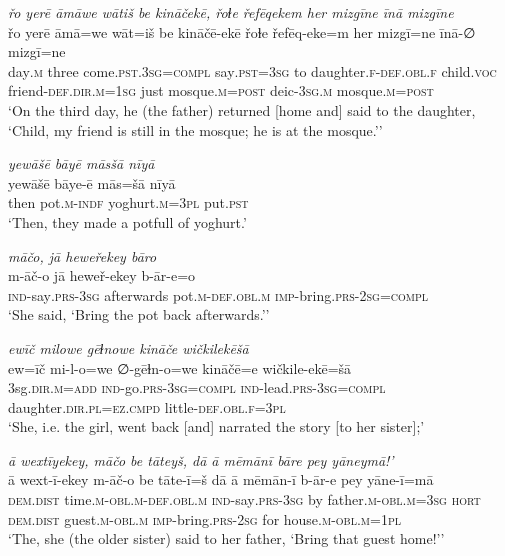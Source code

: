 \ea \label{ŽH.37}
\textit{řo yerē āmāwe wātiš be kināčekē, řoɫe řefēqekem her mizgīne īnā mizgīne} \\ 
\gll řo yerē āmā=we wāt=iš be kināčē-ekē řoɫe řefēq-eke=m her mizgī=ne īnā-∅ mizgī=ne \\ 
 day\textsc{.m} three come\textsc{.pst}\textsc{.3sg}\textsc{=compl} say\textsc{.pst}\textsc{=3sg} to daughter\textsc{\textsc{.f}}\textsc{-def}\textsc{.obl}\textsc{\textsc{.f}} child.\textsc{voc} friend\textsc{-def}\textsc{.dir}\textsc{.m}\textsc{=1sg} just mosque\textsc{.m}\textsc{=\textsc{post}} deic\textsc{-3sg}\textsc{.m} mosque\textsc{.m}\textsc{=\textsc{post}} \\ 
\glt `On the third day, he (the father) returned [home and] said to the daughter, ‘Child, my friend is still in the mosque; he is at the mosque.’'
\z 
 
\ea \label{ŽH.39}
\textit{yewāšē bāyē māsšā nīyā} \\ 
\gll yewāšē bāye-ē mās=šā nīyā \\ 
 then pot\textsc{.m}\textsc{-indf} yoghurt\textsc{.m}\textsc{=3pl} put\textsc{.pst} \\ 
\glt `Then, they made a potfull of yoghurt.'
\z 
 
\ea \label{ŽH.44}
\textit{māčo, jā heweřekey bāro} \\ 
\gll m-āč-o jā heweř-ekey b-ār-e=o \\ 
 \textsc{ind-}say\textsc{.prs}\textsc{-3sg} afterwards pot\textsc{.m}\textsc{-def}\textsc{.obl}\textsc{.m} \textsc{imp-}bring\textsc{.prs}-\textsc{2sg}\textsc{=compl} \\ 
\glt `She said, ‘Bring the pot back afterwards.’'
\z 
 
\ea \label{ŽH.46}
\textit{ewīč milowe gēɫnowe kināče wičkilekēšā} \\ 
\gll ew=īč mi-l-o=we ∅-gēɫn-o=we kināčē=e wičkile-ekē=šā \\ 
 3sg\textsc{.dir}\textsc{.m}\textsc{=add} \textsc{ind-}go\textsc{.prs}\textsc{-3sg}\textsc{=compl} \textsc{ind-}lead\textsc{.prs}\textsc{-3sg}\textsc{=compl} daughter\textsc{.dir}\textsc{.pl}\textsc{=ez}\textsc{.cmpd} little\textsc{-def}\textsc{.obl}\textsc{\textsc{.f}}\textsc{=3pl} \\ 
\glt `She, i.e. the girl, went back [and] narrated the story [to her sister];'
\z 
 
\ea \label{ŽH.50}
\textit{ā wextīyekey, māčo be tāteyš, dā ā mēmānī bāre pey yāneymā!’} \\ 
\gll ā wext-ī-ekey m-āč-o be tāte-ī=š dā ā mēmān-ī b-ār-e pey yāne-ī=mā \\ 
 \textsc{dem.dist} time\textsc{.m}\textsc{-obl}\textsc{.m}\textsc{-def}\textsc{.obl}\textsc{.m} \textsc{ind-}say\textsc{.prs}\textsc{-3sg} by father\textsc{.m}\textsc{-obl}\textsc{.m}\textsc{=3sg} \textsc{hort} \textsc{dem.dist} guest\textsc{.m}\textsc{-obl}\textsc{.m} \textsc{imp-}bring\textsc{.prs}-\textsc{2sg} for house\textsc{.m}\textsc{-obl}\textsc{.m}\textsc{=1pl} \\ 
\glt `The, she (the older sister) said to her father, ‘Bring that guest home!’'
\z 
 

